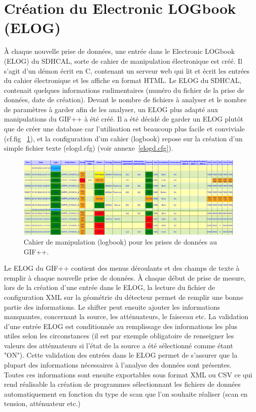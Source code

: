 \section{Création du Electronic LOGbook (ELOG)}
À chaque nouvelle prise de données, une entrée dans le Electronic LOGbook (ELOG) \cite{ELOG} du SDHCAL, sorte de cahier de manipulation électronique est créé. Il s'agit d'un démon écrit en C, contenant un serveur web qui lit et écrit les entrées du cahier électronique et les affiche en format HTML. Le ELOG du SDHCAL, contenait quelques informations rudimentaires (numéro du fichier de la prise de données, date de création). Devant le nombre de fichiers à analyser et le nombre de paramètres à garder afin de les analyser, un ELOG plus adapté aux manipulations du GIF++ à été créé. Il a été décidé de garder un ELOG plutôt que de créer une database car l'utilisation est beaucoup plus facile et conviviale (cf.fig~ \ref{ELOG}), et la configuration d'un cahier (logbook) repose sur la création d'un simple fichier texte (elogd.cfg) (voir annexe~\ref{elogd.cfg}). 

\begin{figure}[!ht]
	\centering
	\includegraphics[width=0.98\linewidth]{GLA/ELOG2.png}
	\caption{Cahier de manipulation (logbook) pour les prises de données au GIF++.}
	\label{ELOG}
\end{figure}

Le ELOG du GIF++ contient des menus déroulants et des champs de texte à remplir à chaque nouvelle prise de données. À chaque début de prise de mesure, lors de la création d'une entrée dans le ELOG, la lecture du fichier de configuration XML sur la géométrie du détecteur permet de remplir une bonne partie des informations. Le shifter peut ensuite ajouter les informations manquantes, concernant la source, les atténuateurs, le faisceau etc. La validation d'une entrée ELOG est conditionnée au remplissage des informations les plus utiles selon les circonstances (il est par exemple obligatoire de renseigner les valeurs des atténuateurs si l'état de la source a été sélectionné comme étant "ON"). Cette validation des entrées dans le ELOG permet de s'assurer que la plupart des informations nécessaires à l'analyse des données sont présentes. Toutes ces informations sont ensuite exportables sous format XML ou CSV ce qui rend réalisable la création de programmes sélectionnant les fichiers de données automatiquement en fonction du type de scan que l'on souhaite réaliser (scan en tension, atténuateur etc.)



